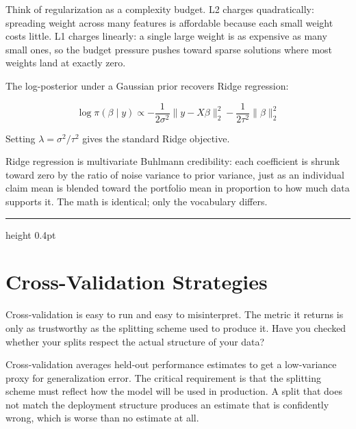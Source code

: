 \documentclass[12pt,a4paper]{article}
\begin{document}
\begin{analogy}
Think of regularization as a complexity budget. L2 charges quadratically:
spreading weight across many features is affordable because each small
weight costs little. L1 charges linearly: a single large weight is
as expensive as many small ones, so the budget pressure pushes toward
sparse solutions where most weights land at exactly zero.
\end{analogy}

The log-posterior under a Gaussian prior recovers Ridge regression:

\begin{equation*}
  \log\pi(\beta \mid y)
  \propto
  -\frac{1}{2\sigma^2}\|y - X\beta\|_2^2
  - \frac{1}{2\tau^2}\|\beta\|_2^2
\end{equation*}

Setting $\lambda = \sigma^2/\tau^2$ gives the standard Ridge objective.

\begin{mentalmodel}
Ridge regression is multivariate Buhlmann credibility: each coefficient is
shrunk toward zero by the ratio of noise variance to prior variance, just
as an individual claim mean is blended toward the portfolio mean in
proportion to how much data supports it. The math is identical; only the
vocabulary differs.
\end{mentalmodel}

\vspace{10pt}\hrule height 0.4pt\vspace{14pt}

\section*{Cross-Validation Strategies}

Cross-validation is easy to run and easy to misinterpret. The metric it
returns is only as trustworthy as the splitting scheme used to produce it.
Have you checked whether your splits respect the actual structure of your
data?

\begin{concept}
Cross-validation averages held-out performance estimates to get a low-variance
proxy for generalization error. The critical requirement is that the splitting
scheme must reflect how the model will be used in production. A split that
does not match the deployment structure produces an estimate that is
confidently wrong, which is worse than no estimate at all.
\end{concept}
\end{document}
